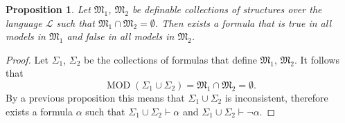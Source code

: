 \documentclass[11pt,a4paper]{article}
\theoremstyle{definition}
\theoremstyle{plain}
\newtheorem{proposition}[theorem]{Proposition}
\DeclareMathOperator{\MOD}{MOD}
\renewcommand{\L}{\mathcal{L}}
\begin{document}
  \begin{proposition}
    Let $\mathfrak M_1$, $\mathfrak M_2$ be definable collections of structures
    over the language $\L$ such that 
    $\mathfrak M_1 \cap \mathfrak M_2 = \emptyset$.
    Then exists a formula that is true in all models in $\mathfrak M_1$
    and false in all models in $\mathfrak M_2$.
  \end{proposition}
  \begin{proof}
    Let $\Sigma_1$, $\Sigma_2$ be the collections of formulas that define
    $\mathfrak M_1$, $\mathfrak M_2$.
    It follows that
    \[
      \MOD(\Sigma_1 \cup \Sigma_2) =
      \mathfrak M_1 \cap \mathfrak M_2 =
      \emptyset.
    \]
    By a previous proposition this means that $\Sigma_1 \cup \Sigma_2$ is
    inconsistent, therefore exists a formula $\alpha$ such that
    $\Sigma_1 \cup \Sigma_2 \vdash \alpha$ and
    $\Sigma_1 \cup \Sigma_2 \vdash \neg \alpha$.
  \end{proof}


  
\end{document}
